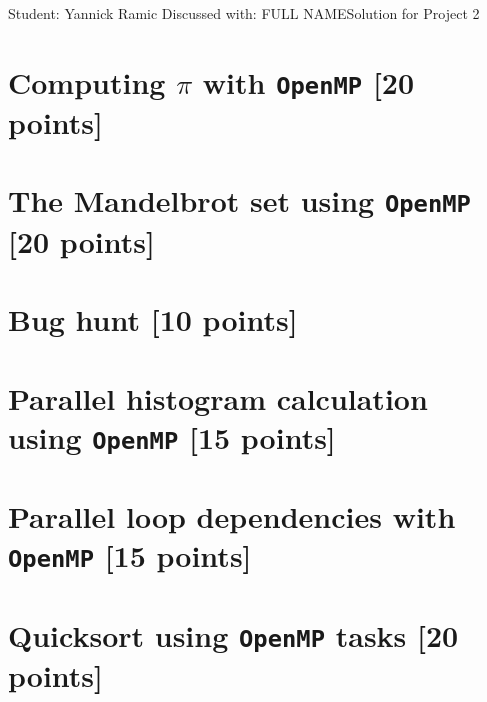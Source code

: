 \documentclass[unicode,11pt,a4paper,oneside,numbers=endperiod,openany]{scrartcl}
\begin{document}
\setassignment
{}

            {Student: Yannick Ramic}
            {Discussed with: FULL NAME}{Solution for Project 2}{}
\newline

\assignmentpolicy

\section{Computing $\pi$ with \texttt{OpenMP} [20 points]}

\section{The Mandelbrot set  using \texttt{OpenMP} [20 points]}

\section{Bug hunt [10 points]}

\section{Parallel histogram calculation using \texttt{OpenMP} [15 points]}

\section{Parallel loop dependencies with \texttt{OpenMP} [15 points]}

\section{Quicksort using \texttt{OpenMP} tasks [20 points]}
\end{document}
